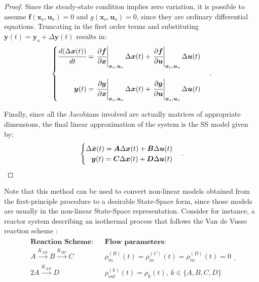 \documentclass[a4paper,11pt]{book}
\numberwithin{figure}{chapter}
\numberwithin{equation}{chapter}
\numberwithin{table}{chapter}
\theoremstyle{definition}
\begin{document}
\begin{proof}
    Since the steady-state condition implies zero variation, it is possible to assume $\bm{f}(\bm{x}_o, \bm{u}_o) = 0$ and $g(\bm{x}_o, \bm{u}_o) = 0$, since they are ordinary differential equations. Truncating in the first order terms and substituting $\bm{y}(t) = \bm{y}_o + \Delta \bm{y}(t)$ results in:
    \begin{align}
    \begin{cases}
        \cfrac{d(\Delta \bm{x}(t))}{dt} =\left. \cfrac{\partial \bm{f}}{\partial \bm{x}}\right\vert_{\bm{x}_o, \bm{u}_o} \Delta \bm{x}(t) + \left. \cfrac{\partial \bm{f}}{\partial \bm{u}}\right\vert_{\bm{x}_o,  \bm{u}_o}  \Delta \bm{u}(t) \\ \\
        \hfill \bm{y}(t) = \left. \cfrac{\partial \bm{g}}{\partial \bm{x}}\right\vert_{\bm{x}_o, \bm{u}_o} \Delta \bm{x}(t) + \left. \cfrac{\partial \bm{g}}{\partial \bm{u}}\right\vert_{\bm{x}_o, \bm{u}_o} \Delta \bm{u}(t) \\
    \end{cases}
    .\end{align}
    
    Finally, since all the Jacobians involved are actually matrices of appropriate dimensions, the final linear approximation of the system is the SS model given by:
    \begin{align}
    \begin{cases}
        \Delta \dot{\bm{x}}(t) = \bm{A}\Delta \bm{x}(t) + \bm{B}\Delta \bm{u}(t) & \\
        \hfill \bm{y}(t) = \bm{C}\Delta \bm{x}(t) + \bm{D}\Delta \bm{u}(t) &
    \end{cases}
    .\end{align}
\end{proof}

Note that this method can be used to convert non-linear models obtained from the first-principle procedure to a desirable State-Space form, since those models are usually in the non-linear State-Space representation. Consider for instance, a reactor system describing an isothermal process that follows the Van de Vusse reaction scheme \cite{VanDeVusse:1964}:
\begin{align}
\begin{matrix}
    \textbf{Reaction Scheme:}  & & \textbf{Flow parameters:} \\ 
    A\overset{K_{AB}}{\rightarrow} B \overset{K_{BC}}{\rightarrow} C & & \rho_{in}^{(B)}(t) = \rho_{in}^{(C)}(t) = \rho_{in}^{(D)}(t) = 0 \\
    2 A \overset{K_{AD}}{\rightarrow} D & &  \rho_{out}^{(k)}(t) = \rho_k(t),\ k \in \{A, B, C, D\}
\end{matrix}    
.\end{align}
\end{document}
